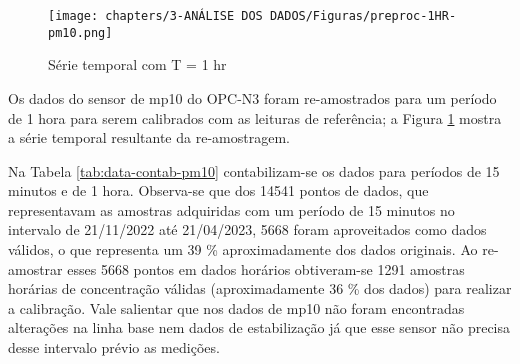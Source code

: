 \begin{figure}[h!]
    \centering
    \texttt{[image: chapters/3-ANÁLISE DOS DADOS/Figuras/preproc-1HR-pm10.png]}
    \caption{Série temporal com T = 1 hr}
    \label{fig:data-pm10-preproc-1HR}
\end{figure}

Os dados do sensor de \acrshort{mp10} do OPC-N3 foram re-amostrados para um período de 1 hora para serem calibrados com as leituras de referência; a Figura \ref{fig:data-pm10-preproc-1HR} mostra a série temporal resultante da re-amostragem.

Na Tabela \ref{tab:data-contab-pm10} contabilizam-se os dados para períodos de 15 minutos e de 1 hora. Observa-se que dos 14541 pontos de dados, que representavam as amostras adquiridas com um período de 15 minutos no intervalo de 21/11/2022 até 21/04/2023, 5668 foram aproveitados como dados válidos, o que representa um 39 \% aproximadamente dos dados originais. Ao re-amostrar esses 5668 pontos em dados horários obtiveram-se 1291 amostras horárias de concentração válidas (aproximadamente 36 \% dos dados) para realizar a calibração. Vale salientar que nos dados de \acrshort{mp10} não foram encontradas alterações na linha base nem dados de estabilização já que esse sensor não precisa desse intervalo prévio as medições.

